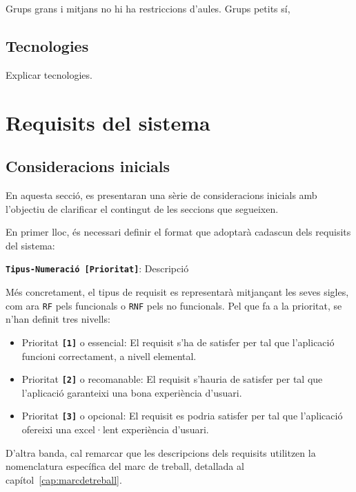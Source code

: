 \documentclass[a4paper,12pt]{ThesisStyle}
\begin{document}
Grups grans i mitjans no hi ha restriccions d'aules. Grups petits sí,

\section{Tecnologies}
\label{sec:tecnologies}

Explicar tecnologies.

\chapter{Requisits del sistema}
\label{cap:requisits}

\section{Consideracions inicials}
\label{sec:consideracions_inicials}

En aquesta secció, es presentaran una sèrie de consideracions inicials amb l'objectiu de clarificar el contingut de les seccions que segueixen.

En primer lloc, és necessari definir el format que adoptarà cadascun dels requisits del sistema:
\vspace*{-0.4cm}
\begin{center}
  \texttt{\textbf{Tipus-Numeració [Prioritat]}}: Descripció
\end{center}

Més concretament, el tipus de requisit es representarà mitjançant les seves sigles, com ara \texttt{RF} pels funcionals o \texttt{RNF} pels no funcionals. Pel que fa a la prioritat, se n'han definit tres nivells:
\begin{itemize}
  \item Prioritat \texttt{\textbf{[1]}} o essencial: El requisit s'ha de satisfer per tal que l'aplicació funcioni correctament, a nivell elemental.
  \item Prioritat \texttt{\textbf{[2]}} o recomanable: El requisit s'hauria de satisfer per tal que l'aplicació garanteixi una bona experiència d'usuari.
  \item Prioritat \texttt{\textbf{[3]}} o opcional: El requisit es podria satisfer per tal que l'aplicació ofereixi una excel·lent experiència d'usuari.
\end{itemize}

D'altra banda, cal remarcar que les descripcions dels requisits utilitzen la nomenclatura específica del marc de treball, detallada al capítol~\ref{cap:marcdetreball}.
\end{document}
